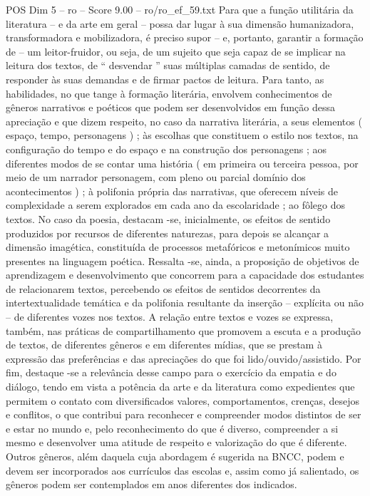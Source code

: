 \begin{textsample}{POS Dim 5 – ro – Score 9.00 – ro/ro\_ef\_59.txt}
Para que a função utilitária da literatura – e da arte em geral – possa dar lugar à sua dimensão humanizadora, transformadora e mobilizadora, é preciso supor – e, portanto, garantir a formação de – um leitor-fruidor, ou seja, de um sujeito que seja capaz de se implicar na leitura dos textos, de “ desvendar ” suas múltiplas camadas de sentido, de responder às suas demandas e de firmar pactos de leitura.
Para tanto, as habilidades, no que tange à formação literária, envolvem conhecimentos de gêneros narrativos e poéticos que podem ser desenvolvidos em função dessa apreciação e que dizem respeito, no caso da narrativa literária, a seus elementos ( espaço, tempo, personagens ) ; às escolhas que constituem o estilo nos textos, na configuração do tempo e do espaço e na construção dos personagens ; aos diferentes modos de se contar uma história ( em primeira ou terceira pessoa, por meio de um narrador personagem, com pleno ou parcial domínio dos acontecimentos ) ; à polifonia própria das narrativas, que oferecem níveis de complexidade a serem explorados em cada ano da escolaridade ; ao fôlego dos textos.
No caso da poesia, destacam -se, inicialmente, os efeitos de sentido produzidos por recursos de diferentes naturezas, para depois se alcançar a dimensão imagética, constituída de processos metafóricos e metonímicos muito presentes na linguagem poética.
Ressalta -se, ainda, a proposição de objetivos de aprendizagem e desenvolvimento que concorrem para a capacidade dos estudantes de relacionarem textos, percebendo os efeitos de sentidos decorrentes da intertextualidade temática e da polifonia resultante da inserção – explícita ou não – de diferentes vozes nos textos.
A relação entre textos e vozes se expressa, também, nas práticas de compartilhamento que promovem a escuta e a produção de textos, de diferentes gêneros e em diferentes mídias, que se prestam à expressão das preferências e das apreciações do que foi lido/ouvido/assistido.
Por fim, destaque -se a relevância desse campo para o exercício da empatia e do diálogo, tendo em vista a potência da arte e da literatura como expedientes que permitem o contato com diversificados valores, comportamentos, crenças, desejos e conflitos, o que contribui para reconhecer e compreender modos distintos de ser e estar no mundo e, pelo reconhecimento do que é diverso, compreender a si mesmo e desenvolver uma atitude de respeito e valorização do que é diferente.
Outros gêneros, além daquela cuja abordagem é sugerida na BNCC, podem e devem ser incorporados aos currículos das escolas e, assim como já salientado, os gêneros podem ser contemplados em anos diferentes dos indicados.

\end{textsample}
